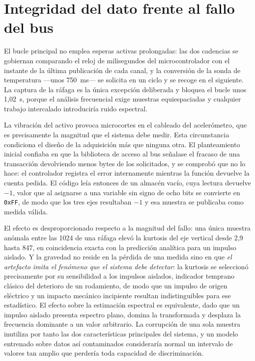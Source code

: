 \section{Integridad del dato frente al fallo del bus}

El bucle principal no emplea esperas activas prolongadas: las dos cadencias se gobiernan
comparando el reloj de milisegundos del microcontrolador con el instante de la última publicación
de cada canal, y la conversión de la sonda de temperatura —unos \mbox{750 ms}— se solicita en un
ciclo y se recoge en el siguiente. La captura de la ráfaga es la única excepción deliberada y
bloquea el bucle unos \mbox{1,02 s}, porque el análisis frecuencial exige muestras equiespaciadas
y cualquier trabajo intercalado introduciría ruido espectral.

La vibración del activo provoca microcortes en el cableado del acelerómetro, que es precisamente
la magnitud que el sistema debe medir. Esta circunstancia condiciona el diseño de la adquisición
más que ninguna otra. El planteamiento inicial confiaba en que la biblioteca de acceso al bus
señalase el fracaso de una transacción devolviendo menos bytes de los solicitados, y se comprobó
que no lo hace: el controlador registra el error internamente mientras la función devuelve la
cuenta pedida. El código leía entonces de un almacén vacío, cuya lectura devuelve $-1$, valor que
al asignarse a una variable sin signo de ocho bits se convierte en \texttt{0xFF}, de modo que los
tres ejes resultaban $-1$ y esa muestra se publicaba como medida válida.

El efecto es desproporcionado respecto a la magnitud del fallo: una única muestra anómala entre
las 1024 de una ráfaga elevó la kurtosis del eje vertical desde 2,9 hasta 847, en coincidencia
exacta con la predicción analítica para un impulso aislado. Y la gravedad no reside en la pérdida
de una medida sino en que \textit{el artefacto imita el fenómeno que el sistema debe detectar}: la
kurtosis se seleccionó precisamente por su sensibilidad a los impulsos aislados, indicador
temprano clásico del deterioro de un rodamiento, de modo que un impulso de origen eléctrico y un
impacto mecánico incipiente resultan indistinguibles para ese estadístico. El efecto sobre la
estimación espectral es equivalente, dado que un impulso aislado presenta espectro plano, domina
la transformada y desplaza la frecuencia dominante a un valor arbitrario. La corrupción de una
sola muestra inutiliza por tanto las dos características principales del sistema, y un modelo
entrenado sobre datos así contaminados consideraría normal un intervalo de valores tan amplio que
perdería toda capacidad de discriminación.

